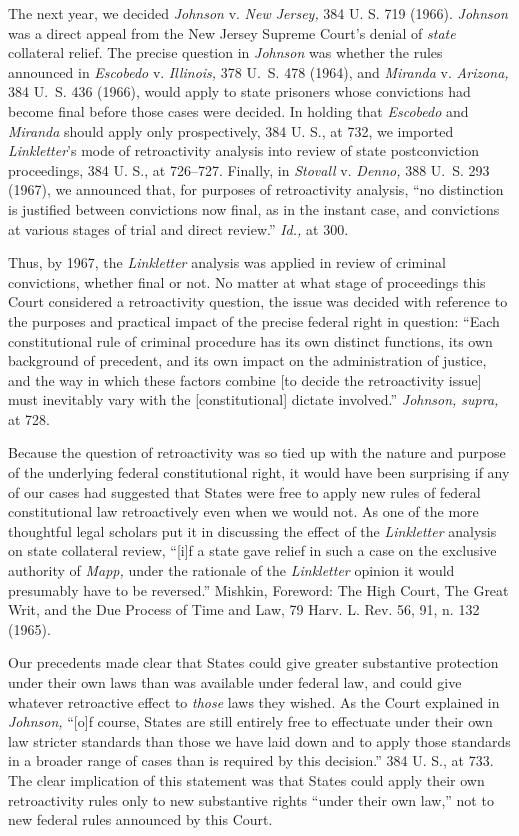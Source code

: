   The next year, we decided \emph{Johnson} v. \emph{New Jersey,} 384 U. S. 719 (1966). \emph{Johnson} was a direct appeal from the New Jersey Supreme Court's denial of \emph{state} collateral relief. The precise question in \emph{Johnson} was whether the rules announced in \emph{Escobedo} v. \emph{Illinois,} 378 U.~S. 478 (1964), and \emph{Miranda} v. \emph{Arizona,} 384 U.~S. 436 (1966), would apply to state prisoners whose convictions had become final before those cases were decided. In holding that \emph{Escobedo} and \emph{Miranda} should apply only prospectively, 384 U. S., at 732, we imported \emph{Linkletter}'s mode of retroactivity analysis into review of state postconviction proceedings, 384 U. S., at 726--727. Finally, in \emph{Stovall} v. \emph{Denno,} 388 U.~S. 293 (1967), we announced that, for purposes of retroactivity analysis, ``no distinction is justified between convictions now final, as in the instant case, and convictions at various stages of trial and direct review.'' \emph{Id.,} at 300.

  Thus, by 1967, the \emph{Linkletter} analysis was applied in review of criminal convictions, whether final or not. No matter at what stage of proceedings this Court considered a retroactivity question, the issue was decided with reference to the purposes and practical impact of the precise federal right in question: ``Each constitutional rule of criminal procedure has its own distinct functions, its own background of precedent, and its own impact on the administration of justice, and the way in which these factors combine [to decide the retroactivity issue] must inevitably vary with the [constitutional] dictate involved.'' \emph{Johnson, supra,} at 728.

  Because the question of retroactivity was so tied up with the nature and purpose of the underlying federal constitutional right, it would have been surprising if any of our cases had suggested that States were free to apply new rules of federal constitutional law retroactively even when we would not. As one of the more thoughtful legal scholars put it in discussing the effect of the \emph{Linkletter} analysis on state col\newpage lateral review, ``[i]f a state gave relief in such a case on the exclusive authority of \emph{Mapp,} under the rationale of the \emph{Linkletter} opinion it would presumably have to be reversed.'' Mishkin, Foreword: The High Court, The Great Writ, and the Due Process of Time and Law, 79 Harv. L. Rev. 56, 91, n. 132 (1965).

  Our precedents made clear that States could give greater substantive protection under their own laws than was available under federal law, and could give whatever retroactive effect to \emph{those} laws they wished. As the Court explained in \emph{Johnson,} ``[o]f course, States are still entirely free to effectuate under their own law stricter standards than those we have laid down and to apply those standards in a broader range of cases than is required by this decision.'' 384 U. S., at 733. The clear implication of this statement was that States could apply their own retroactivity rules only to new substantive rights ``under their own law,'' not to new federal rules announced by this Court.

